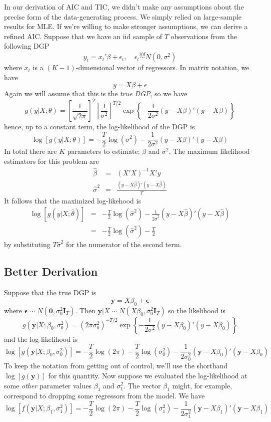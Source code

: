 \documentclass[12pt]{article}
\theoremstyle{definition}
\begin{document}
In our derivation of AIC and TIC, we didn't make any assumptions about the precise form of the data-generating process. We simply relied on large-sample results for MLE. If we're willing to make stronger assumptions, we can derive a refined AIC. Suppose that we have an iid sample of $T$ observations from the following DGP
	$$y_t = x_t'\beta + \epsilon_t, \quad \epsilon_t \overset{iid}{\sim} N(0, \sigma^2)$$
where $x_t$ is a $(K-1)$-dimensional vector of regressors. In matrix notation, we have
	$$y = X\beta + \epsilon$$
Again we will assume that this is the \emph{true DGP}, so we have
	$$g(y|X;\theta) = \left[\frac{1}{\sqrt{2\pi}} \right]^{T} \left[\frac{1}{\sigma^2} \right]^{T/2}\exp\left\{ -\frac{1}{2\sigma^2}(y - X\beta)'(y - X\beta)\right\}$$
hence, up to a constant term, the log-likelihood of the DGP is
	$$\log\left[g(y|X;\theta)\right] = -\frac{T}{2} \log(\sigma^2) - \frac{1}{2\sigma^2}\left(y - X\beta\right)'\left(y -X\beta\right)$$
In total there are $K$ parameters to estimate: $\beta$ and $\sigma^2$. The maximum likelihood estimators for this problem are
\begin{eqnarray*}
	\widehat{\beta} &=& (X'X)^{-1}X'y\\
	\widehat{\sigma}^2 &=& \frac{(y - X\widehat{\beta})'(y - X\widehat{\beta})}{T}
\end{eqnarray*}
It follows that the maximized log-likehood is
\begin{eqnarray*}
	\log\left[g(y|X;\widehat{\theta})\right] &=&  -\frac{T}{2} \log(\widehat{\sigma}^2) - \frac{1}{2\widehat{\sigma}^2}(y - X\widehat{\beta})'(y -X\widehat{\beta})\\
		&=& -\frac{T}{2} \log(\widehat{\sigma}^2) - \frac{T}{2}
\end{eqnarray*}
by substituting $T\widehat{\sigma}^2$ for the numerator of the second term.



\subsection{Better Derivation}
Suppose that the true DGP is
	$$\textbf{y} = X\beta_0 + \boldsymbol{\epsilon}$$
where $\mathbf{\epsilon} \sim N(\mathbf{0}, \sigma_0^2 \mathbf{I}_T)$. Then $\mathbf{y}|X \sim N(X\beta_0, \sigma_0^2 \mathbf{I}_T)$ so the likelihood is
	$$g(\textbf{y}|X;\beta_0, \sigma^2_0) = \left(2\pi\sigma_0^2\right)^{-T/2} \exp\left\{ -\frac{1}{2\sigma^2}(y - X\beta_0)'(y - X\beta_0)\right\}$$
and the log-likelihood is
	$$\log\left[g(\textbf{y}|X;\beta_0, \sigma_0^2)\right] = -\frac{T}{2}\log(2\pi) -\frac{T}{2} \log(\sigma^2_0) - \frac{1}{2\sigma_0^2}\left(\textbf{y} - X\beta_0\right)'\left(\textbf{y} -X\beta_0\right)$$
To keep the notation from getting out of control, we'll use the shorthand $\log[g(\mathbf{y})]$ for this quantity. Now suppose we evaluated the log-likelihood at some \emph{other} parameter values $\beta_1$ and $\sigma^2_1$. The vector $\beta_1$ might, for example, correspond to dropping some regressors from the model. We have
	$$\log[f(\textbf{y}|X;\beta_1, \sigma_1^2)] =  -\frac{T}{2}\log(2\pi) -\frac{T}{2} \log(\sigma^2_1) - \frac{1}{2\sigma_1^2}\left(\textbf{y} - X\beta_1\right)'\left(\textbf{y} -X\beta_1\right)$$
\end{document}
